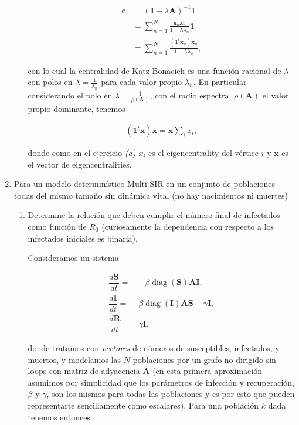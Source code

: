 \documentclass[answers]{exam}
\begin{document}
\begin{questions}
\begin{enumerate}
\begin{enumerate}
\begin{solution}
\begin{align*}
    \mathbf{c} &= (\mathbf{I} - \lambda\mathbf{A})^{-1}\mathbf{1}\\
    &= \sum_{n=1}^N\frac{\mathbf{x}_n\mathbf{x}_n^t}{1 - \lambda\lambda_n}\mathbf{1}\\
    &= \sum_{n=1}^N\frac{(\mathbf{1}^t\mathbf{x}_n)\mathbf{x}_n}{1 - \lambda\lambda_n},
\end{align*}

con lo cual la centralidad de Katz-Bonacich es una función racional de $\lambda$ con polos en $\lambda = \frac{1}{\lambda_n}$ para cada valor propio $\lambda_n$. En particular considerando el polo en $\lambda = \frac{1}{\rho(\mathbf{A})}$, con el radio espectral $\rho(\mathbf{A})$ el valor propio dominante, tenemos

\begin{align*}
    (\mathbf{1}^t\mathbf{x})\mathbf{x} = \mathbf{x}\sum_ix_i,
\end{align*}

donde como en el ejercicio \emph{(a)} $x_i$ es el eigencentrality del vértice $i$ y $\mathbf{x}$ es el vector de eigencentralities.
\end{solution}

\end{enumerate}

\item Para un modelo determinístico Multi-SIR en un conjunto de poblaciones todas del mismo tamaño sin dinámica vital (no hay nacimientos ni muertes)

\begin{enumerate}

\item Determine la relación que deben cumplir el número final de infectados como función de $R_0$ (curiosamente la dependencia con respecto a los infectados iniciales es binaria).

\begin{solution}
Consideramos un sistema

\begin{align*}
     \dfrac{d\mathbf{S}}{dt}=&-\beta \operatorname{diag}(\mathbf{S})\mathbf{A}\mathbf{I},\\
     \dfrac{d\mathbf{I}}{dt}=&\beta \operatorname{diag}(\mathbf{I})\mathbf{A}\mathbf{S} -\gamma \mathbf{I},\\
     \dfrac{d\mathbf{R}}{dt}=&\gamma \mathbf{I},
\end{align*}

donde tratamos con \emph{vectores} de números de susceptibles, infectados, y muertos, y modelamos las $N$ poblaciones por un grafo no dirigido sin loops con matriz de adyacencia $\mathbf{A}$ (en esta primera aproximación asumimos por simplicidad que los parámetros de infección y recuperación, $\beta$ y $\gamma$, son los mismos para todas las poblaciones y es por esto que pueden representarte sencillamente como escalares). Para una población $k$ dada tenemos entonces


\end{solution}
\end{enumerate}
\end{enumerate}
\end{questions}
\end{document}
